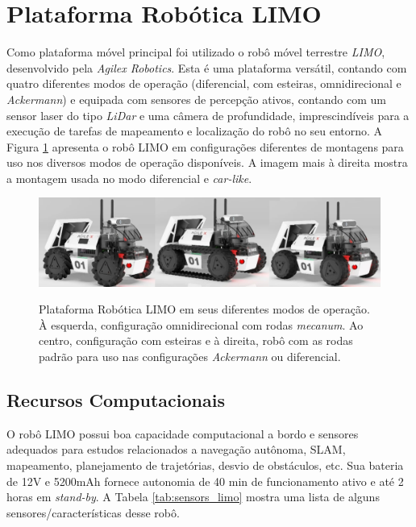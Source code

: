 \section{Plataforma Robótica LIMO}
\label{sec:Plataforma_LIMO}

    Como plataforma móvel principal foi utilizado o robô móvel terrestre \textit{LIMO}, desenvolvido pela \textit{Agilex Robotics}\cite{site:Agilex_Robotics}. Esta é uma plataforma versátil, contando com quatro diferentes modos de operação (diferencial, com esteiras, omnidirecional e \textit{Ackermann}) e equipada com sensores de percepção ativos, contando com um sensor laser do tipo \textit{LiDar} e uma câmera de profundidade, imprescindíveis para a execução de tarefas de mapeamento e localização do robô no seu entorno. A Figura \ref{fig:LIMO_MODES} apresenta o robô LIMO em configurações diferentes de montagens para uso nos diversos modos de operação disponíveis. A imagem mais à direita mostra a montagem usada no modo diferencial e \textit{car-like}.

    \begin{figure}[htb]
        \centering
        \caption{Plataforma Robótica LIMO em seus diferentes modos de operação. À esquerda, configuração omnidirecional com rodas \textit{mecanum}. Ao centro, configuração com esteiras e à direita, robô com as rodas padrão para uso nas configurações \textit{Ackermann} ou diferencial.}
        \includegraphics[width=\linewidth]{img/Limo_modes.png}
        \label{fig:LIMO_MODES}
    \end{figure}

    \subsection{Recursos Computacionais}
    \label{sec:Recursos_LIMO}
        O robô LIMO possui boa capacidade computacional a bordo e sensores adequados para estudos relacionados a navegação autônoma, SLAM, mapeamento, planejamento de trajetórias, desvio de obstáculos, etc. Sua bateria de 12V e 5200mAh fornece autonomia de 40 min de funcionamento ativo e até 2 horas em \textit{stand-by}. A Tabela \ref{tab:sensors_limo} mostra uma lista de alguns sensores/características desse robô.

